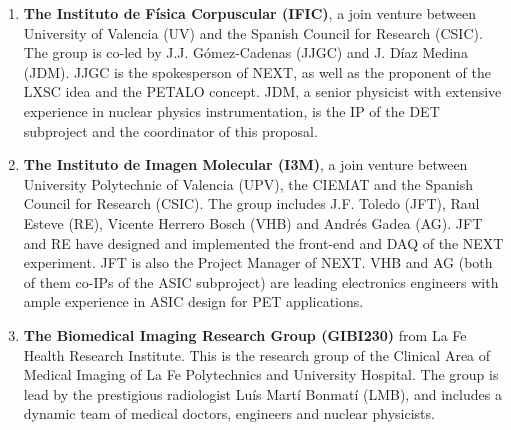 \begin{enumerate}
\item {\bf The Instituto de Física Corpuscular (IFIC)}, a join venture between University of Valencia (UV) and the Spanish Council for Research (CSIC). The group is co-led by J.J. G\'omez-Cadenas (JJGC) and J. Díaz Medina (JDM).  JJGC is the spokesperson of NEXT, as well as the proponent of the LXSC idea and the PETALO concept. JDM, a senior physicist with extensive experience in nuclear physics instrumentation, is the IP of the DET subproject and the coordinator of this proposal. 
\item {\bf The Instituto de Imagen Molecular (I3M)}, a join venture between University Polytechnic of Valencia (UPV), the CIEMAT and the Spanish Council for Research (CSIC). The group includes J.F. Toledo (JFT), Raul Esteve (RE), Vicente Herrero Bosch (VHB) and Andrés Gadea (AG). JFT and RE have designed and implemented the front-end and DAQ of the NEXT experiment. JFT is also the Project Manager of NEXT. VHB and AG (both of them co-IPs of the ASIC subproject) are leading electronics engineers with ample experience in ASIC design for PET applications.  
\item {\bf The  Biomedical Imaging Research Group (GIBI230)} from La Fe Health Research Institute. This is the research group of the Clinical Area of Medical Imaging of La Fe Polytechnics and University Hospital. The group is lead by the prestigious radiologist Luís Martí Bonmatí (LMB), and includes a dynamic team of medical doctors, engineers and nuclear physicists.  
\end{enumerate}

